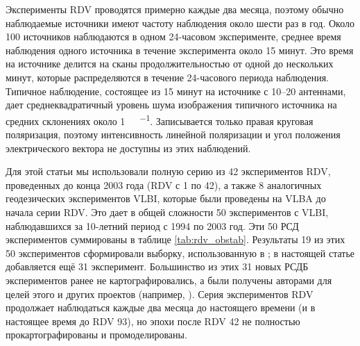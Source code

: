 Эксперименты RDV проводятся примерно каждые два месяца, поэтому обычно наблюдаемые источники
имеют частоту наблюдения около шести раз в год. Около 100 источников наблюдаются в одном 24-часовом
эксперименте, среднее время наблюдения одного источника в течение эксперимента около 15 минут. Это
время на источнике делится на сканы продолжительностью от одной до нескольких минут, которые
распределяются в течение 24-часового периода наблюдения. Типичное наблюдение, состоящее из 15 минут
на источнике с 10--20 антеннами, дает среднеквадратичный уровень шума изображения типичного
источника на средних склонениях около \SI{1}{\milli\jansky\per\beam}. Записывается только правая
круговая поляризация, поэтому интенсивность линейной поляризации и угол положения электрического
вектора не доступны из этих наблюдений.

Для этой статьи мы использовали полную серию из 42 экспериментов RDV, проведенных до конца 2003 года
(RDV с 1 по 42), а также 8 аналогичных геодезических экспериментов VLBI, которые были проведены на
VLBA до начала серии RDV. Это дает в общей сложности 50 экспериментов с VLBI, наблюдавшихся за
10-летний период с 1994 по 2003 год. Эти 50 РСД экспериментов суммированы в таблице
\ref{tab:rdv_obstab}. Результаты 19 из этих 50 экспериментов сформировали выборку, использованную в
\cite{Piner_2007}; в настоящей статье добавляется ещё 31 эксперимент. Большинство из этих 31 новых
РСДБ экспериментов ранее не картографировались, а были получены авторами для целей этого и других
проектов (например, \cite{Pushkarev_2012b}). Серия экспериментов RDV продолжает наблюдаться каждые
два месяца до настоящего времени (и в настоящее время до RDV 93), но эпохи после RDV 42 не полностью
прокартографированы и промоделированы.

